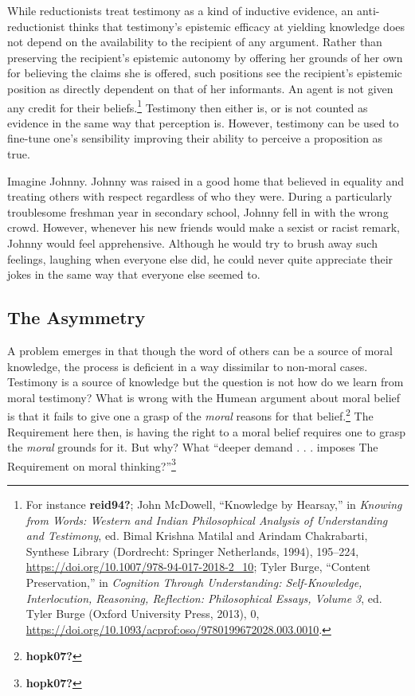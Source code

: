 \documentclass[phdthesis,12pt,final]{wuthesis}
\theoremstyle{definition}
\theoremstyle{definition}
\theoremstyle{definition}
\theoremstyle{definition}
\theoremstyle{remark}
\begin{document}
While reductionists treat testimony as a kind of inductive evidence, an anti-reductionist thinks that testimony's epistemic efficacy at yielding knowledge does not depend on the availability to the recipient of any argument. Rather than preserving the recipient's epistemic autonomy by offering her grounds of her own for believing the claims she is offered, such positions see the recipient's epistemic position as directly dependent on that of her informants. An agent is not given any credit for their beliefs.\footnote{For instance \textbf{reid94?}; John McDowell, {``Knowledge by {Hearsay},''} in \emph{Knowing from {Words}: {Western} and {Indian Philosophical Analysis} of {Understanding} and {Testimony}}, ed. Bimal Krishna Matilal and Arindam Chakrabarti, Synthese {Library} (Dordrecht: Springer Netherlands, 1994), 195--224, \url{https://doi.org/10.1007/978-94-017-2018-2_10}; Tyler Burge, {``Content {Preservation},''} in \emph{Cognition {Through Understanding}: {Self-Knowledge}, {Interlocution}, {Reasoning}, {Reflection}: {Philosophical Essays}, {Volume} 3}, ed. Tyler Burge (Oxford University Press, 2013), 0, \url{https://doi.org/10.1093/acprof:oso/9780199672028.003.0010}.} Testimony then either is, or is not counted as evidence in the same way that perception is. However, testimony can be used to fine-tune one's sensibility improving their ability to perceive a proposition as true.

Imagine Johnny. Johnny was raised in a good home that believed in equality and treating others with respect regardless of who they were. During a particularly troublesome freshman year in secondary school, Johnny fell in with the wrong crowd. However, whenever his new friends would make a sexist or racist remark, Johnny would feel apprehensive. Although he would try to brush away such feelings, laughing when everyone else did, he could never quite appreciate their jokes in the same way that everyone else seemed to.

\subsection*{The Asymmetry}\label{the-asymmetry}

A problem emerges in that though the word of others can be a source of moral knowledge, the process is deficient in a way dissimilar to non-moral cases. Testimony is a source of knowledge but the question is not how do we learn from moral testimony? What is wrong with the Humean argument about moral belief is that it fails to give one a grasp of the \emph{moral} reasons for that belief.\footnote{\textbf{hopk07?}} The Requirement here then, is having the right to a moral belief requires one to grasp the \emph{moral} grounds for it. But why? What ``deeper demand . . . imposes The Requirement on moral thinking?''\footnote{\textbf{hopk07?}}
\end{document}
